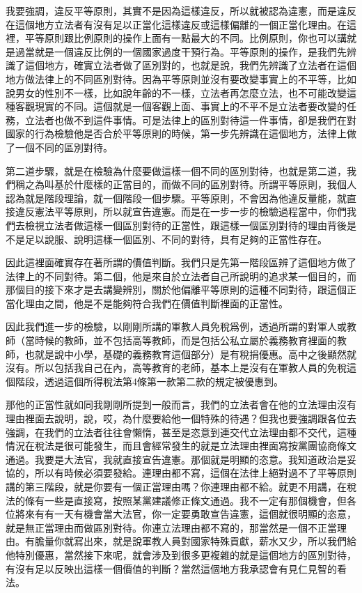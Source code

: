 \documentclass[]{ctexbook}
\begin{document}
我要強調，違反平等原則，其實不是因為這樣違反，所以就被認為違憲，而是違反在這個地方立法者有沒有足以正當化這樣違反或這樣偏離的一個正當化理由。在這裡，平等原則跟比例原則的操作上面有一點最大的不同。比例原則，你也可以講就是過當就是一個違反比例的一個國家過度干預行為。平等原則的操作，是我們先辨識了這個地方，確實立法者做了區別對的，也就是說，我們先辨識了立法者在這個地方做法律上的不同區別對待。因為平等原則並沒有要改變事實上的不平等，比如說男女的性別不一樣，比如說年齡的不一樣，立法者再怎麼立法，也不可能改變這種客觀現實的不同。這個就是一個客觀上面、事實上的不平不是立法者要改變的任務，立法者也做不到這件事情。可是法律上的區別對待這一件事情，卻是我們在對國家的行為檢驗他是否合於平等原則的時候，第一步先辨識在這個地方，法律上做了一個不同的區別對待。

第二道步驟，就是在檢驗為什麼要做這樣一個不同的區別對待，也就是第二道，我們稱之為叫基於什麼樣的正當目的，而做不同的區別對待。所謂平等原則，我個人認為就是階段理論，就一個階段一個步驟。平等原則，不會因為他違反量能，就直接違反憲法平等原則，所以就宣告違憲。而是在一步一步的檢驗過程當中，你們我們去檢視立法者做這樣一個區別對待的正當性，跟這樣一個區別對待的理由背後是不是足以說服、說明這樣一個區別、不同的對待，具有足夠的正當性存在。

因此這裡面確實存在著所謂的價值判斷。我們只是先第一階段區辨了這個地方做了法律上的不同對待。第二個，他是來自於立法者自己所說明的追求某一個目的，而那個目的接下來才是去講變辨別，關於他偏離平等原則的這種不同對待，跟這個正當化理由之間，他是不是能夠符合我們在價值判斷裡面的正當性。

因此我們進一步的檢驗，以剛剛所講的軍教人員免稅爲例，透過所謂的對軍人或教師（當時候的教師，並不包括高等教師，而是包括公私立屬於義務教育裡面的教師，也就是說中小學，基礎的義務教育這個部分）是有稅捐優惠。高中之後顯然就沒有。所以包括我自己在內，高等教育的老師，基本上是沒有在軍教人員的免稅這個階段，透過這個所得稅法第4條第一款第二款的規定被優惠到。

那他的正當性就如同我剛剛所提到一般而言，我們的立法者會在他的立法理由沒有理由裡面去說明，說，哎，為什麼要給他一個特殊的待遇？但我也要強調跟各位去強調，在我們的立法者往往會懶惰，甚至是恣意到連交代立法理由都不交代，這種情況在稅法是很可能發生，而且會經常發生的就是立法理由裡面寫按黨團協商條文通過。我要是大法官，我就直接宣告違憲。那個就是明顯的恣意。我知道政治是妥協的，所以有時候必須要發給。連理由都不寫，這個在法律上絕對過不了平等原則講的第三階段，就是你要有一個正當理由嗎？你連理由都不給。就更不用講，在稅法的條有一些是直接寫，按照某黨建議修正條文通過。我不一定有那個機會，但各位將來有有一天有機會當大法官，你一定要勇敢宣告違憲，這個就很明顯的恣意，就是無正當理由而做區別對待。你連立法理由都不寫的，那當然是一個不正當理由。有膽量你就寫出來，就是說軍教人員對國家特殊貢獻，薪水又少，所以我們給他特別優惠，當然接下來呢，就會涉及到很多更複雜的就是這個地方的區別對待，有沒有足以反映出這樣一個價值的判斷？當然這個地方我承認會有見仁見智的看法。
\end{document}
